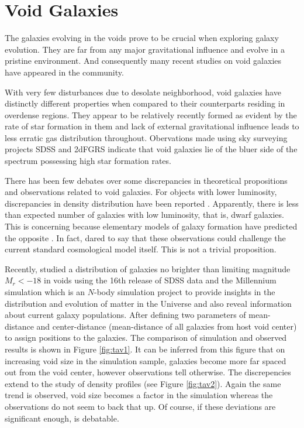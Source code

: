 \documentclass[fleqn,usenatbib]{mnras}
\begin{document}
\section{Void Galaxies}
The galaxies evolving in the voids prove to be crucial when exploring galaxy evolution. They are far from any major gravitational influence and evolve in a pristine environment. And consequently many recent studies on void galaxies have appeared in the community.


With very few disturbances due to desolate neighborhood, void galaxies have distinctly different properties when compared to their counterparts residing in overdense regions. They appear to be relatively recently formed as evident by the rate of star formation in them and lack of external gravitational influence leads to less erratic gas distribution throughout.
Obervations made using sky surveying projects SDSS and 2dFGRS indicate that void galaxies lie of the bluer side of the spectrum possessing high star formation rates.

There has been few debates over some discrepancies in theoretical propositions and observations related to void galaxies. For objects with lower luminosity, discrepancies in density distribution have been reported \citep{karachentsev_catalog_2004}. Apparently, there is less than expected number of galaxies with low luminosity, that is, dwarf galaxies. This is concerning because elementary models of galaxy formation \citep{little_cosmic_1994} have predicted the opposite \citep{wyse_formation_1992}. In fact, \cite{peebles_void_2001} dared to say that these observations could challenge the current standard cosmological model itself. This is not a trivial proposition. 

Recently, \cite{tavasoli_void_2021} studied a distribution of galaxies no brighter than limiting magnitude $ M_r < -18 $ in voids using the 16th release of SDSS data and the Millennium simulation which is an $ N $-body simulation project to provide insights in the distribution and evolution of matter in the Universe and also reveal information about current galaxy populations. After defining two parameters of mean-distance and center-distance (mean-distance of all galaxies from host void center) to assign positions to the galaxies. The comparison of simulation and observed results is shown in Figure \ref{fig:tav1}. It can be inferred from this figure that on increasing void size in the simulation sample, galaxies become more far spaced out from the void center, however observations tell otherwise. The discrepencies extend to the study of density profiles (see Figure \ref{fig:tav2}). Again the same trend is observed, void size becomes a factor in the simulation whereas the observations do not seem to back that up. Of course, if these deviations are significant enough, is debatable. 
\end{document}
